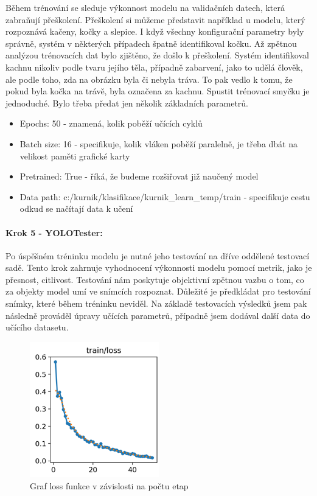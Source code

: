 Během trénování se sleduje výkonnost modelu na validačních datech, která zabraňují přeškolení.
Přeškolení si můžeme představit například u modelu, který rozpoznává kačeny, kočky a slepice.
I když všechny konfigurační parametry byly správně,  systém v některých případech špatně identifikoval kočku.
Až zpětnou analýzou trénovacích dat bylo zjištěno, že došlo k přeškolení.
Systém identifikoval kachnu nikoliv podle tvaru jejího těla, případně zabarvení, jako to udělá člověk, ale podle toho, zda na obrázku byla či nebyla tráva.
To pak vedlo k tomu, že pokud byla kočka na trávě, byla označena za kachnu.
Spustit trénovací smyčku je jednoduché.
Bylo třeba předat jen několik základních parametrů.


\begin{itemize}
    \item Epochs: 50 - znamená, kolik poběží učících cyklů
    \item Batch size: 16 - specifikuje, kolik vláken poběží paralelně, je třeba dbát na velikost paměti grafické karty
    \item Pretrained: True - říká, že budeme rozšiřovat již naučený model
    \item Data path: c:/kurnik/klasifikace/kurnik\_learn\_temp/train - specifikuje cestu odkud se načítají data k učení
\end{itemize}

\paragraph*{Krok 5 - YOLOTester:}

Po úspěšném tréninku modelu je nutné jeho testování na dříve oddělené testovací sadě.
Tento krok zahrnuje vyhodnocení výkonnosti modelu pomocí metrik, jako je přesnost, citlivost.
Testování nám poskytuje objektivní zpětnou vazbu o tom, co za objekty model umí ve snímcích rozpoznat.
Důležité je předkládat pro testování snímky, které během tréninku neviděl.
Na základě testovacích výsledků jsem pak následně prováděl úpravy učících parametrů, případně jsem dodával další data do učícího datasetu.

\begin{figure}[htbp]
    \centering
    \includegraphics[width=0.5\textwidth]{img/loss_funkce}
    \caption{Graf loss funkce v závislosti na počtu etap}
    \label{fig:loss_funkce}
\end{figure}

